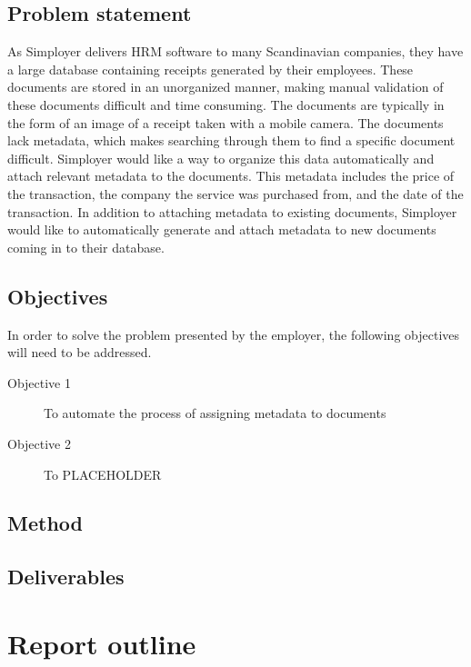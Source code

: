 \subsection{Problem statement}\label{subsec:problem-statement}
As Simployer delivers HRM software to many Scandinavian companies, they have a large database containing receipts generated by their employees.
These documents are stored in an unorganized manner, making manual validation of these documents difficult and time consuming.
The documents are typically in the form of an image of a receipt taken with a mobile camera.
The documents lack metadata, which makes searching through them to find a specific document difficult.
Simployer would like a way to organize this data automatically and attach relevant metadata to the documents.
This metadata includes the price of the transaction, the company the service was purchased from, and the date of the transaction.
In addition to attaching metadata to existing documents, Simployer would like to automatically generate and attach metadata to new documents coming in to their database.

\subsection{Objectives}\label{subsec:objectives}
In order to solve the problem presented by the employer, the following objectives will need to be addressed.
\begin{description}
    \item[Objective 1] To automate the process of assigning metadata to documents
    \item[Objective 2] To PLACEHOLDER
\end{description}

\subsection{Method}\label{subsec:method}

\subsection{Deliverables}\label{subsec:deliverables}

\section{Report outline}\label{sec:report-outline}



